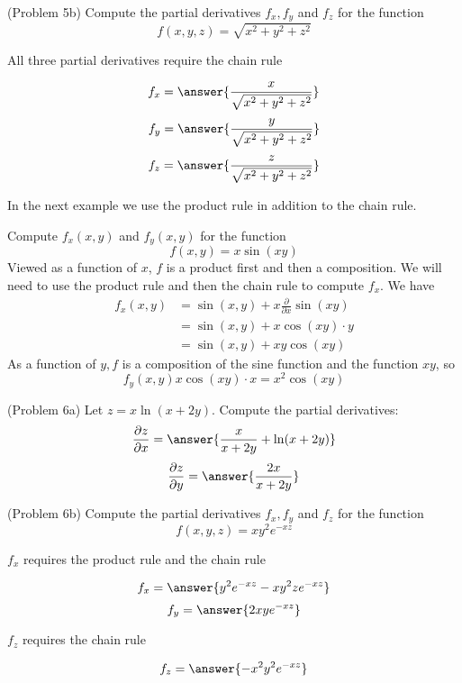 \documentclass[handout]{ximera}
\begin{document}
\begin{problem}(Problem 5b)
Compute the partial derivatives $f_x, f_y$ and $f_z$ for the function
\[
f(x,y,z) = \sqrt{x^2 + y^2 + z^2}
\]
\begin{hint}
All three partial derivatives require the chain rule
\end{hint}
\[
f_x = \answer{\frac{x}{\sqrt{x^2 + y^2 + z^2}}}
\]
\[
f_y = \answer{\frac{y}{\sqrt{x^2 + y^2 + z^2}}}
\]
\[
f_z = \answer{\frac{z}{\sqrt{x^2 + y^2 + z^2}}}
\]

\end{problem}

In the next example we use the product rule in addition to the chain rule.

\begin{example}[Example 6]
Compute $f_x(x,y)$ and $f_y(x,y)$ for the function 
\[
f(x,y) = x\sin(xy)
\]
Viewed as a function of $x$, $f$ is a product first and then a composition. We will need to use the product rule and then
the chain rule to compute $f_x$.
We have
\begin{align*}
f_x(x,y) &= \sin(x,y) + x \frac{\partial}{\partial x} \sin(xy)\\
         & = \sin(x,y) + x \cos(xy) \cdot y\\
         & = \sin(x,y) + xy \cos(xy)
\end{align*}
As a function of $y, f$ is a composition of the sine function and the function $xy$, so
\[
f_y(x,y) x \cos(xy) \cdot x = x^2 \cos(xy)
\]

\end{example}


\begin{problem}(Problem 6a)
Let $z = x\ln(x+ 2y)$. Compute the partial derivatives:
\[
\frac{\partial z}{\partial x} = \answer{\frac{x}{x+2y} + \ln(x+2y)}
\]
\[
\frac{\partial z}{\partial y} = \answer{\frac{2x}{x+2y}}
\]
\end{problem}



\begin{problem}(Problem 6b)
Compute the partial derivatives $f_x, f_y$ and $f_z$ for the function
\[
f(x,y,z) = xy^2 e^{-xz}
\]
\begin{hint}
$f_x$ requires the product rule and the chain rule
\end{hint}

\[
f_x = \answer{y^2e^{-xz} - xy^2ze^{-xz}}
\]
\[
f_y = \answer{2xye^{-xz}}
\]
\begin{hint}
$f_z$ requires the chain rule
\end{hint}

\[
f_z = \answer{-x^2y^2 e^{-xz}}
\]
\end{problem}
\end{document}
